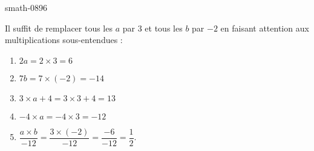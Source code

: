 
\begin{corrige}{smath-0896}

    Il suffit de remplacer tous les \( a\) par \( 3\) et tous les \( b\) par \( -2\) en faisant attention aux multiplications sous-entendues :
    \begin{multicols}{2}
        \begin{enumerate}
            \item
                \( 2a=2\times 3=6\)
            \item
                \( 7b=7\times (-2)=-14\)
            \item
                \( 3\times a+4=3\times 3+4=13\)
            \item
                \(  -4\times a=-4\times 3=-12\)
            \item 
                \( \dfrac{ a\times b }{ -12 }=\dfrac{ 3\times (-2) }{ -12 }=\dfrac{ -6 }{ -12 }=\dfrac{ 1 }{2}\).
        \end{enumerate}
    \end{multicols}

\end{corrige}
